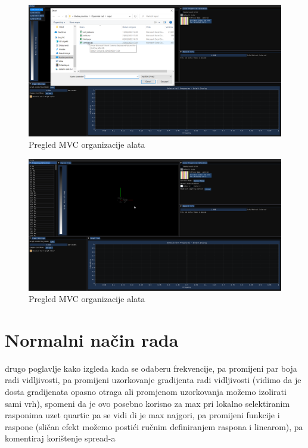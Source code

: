 \documentclass[times, utf8, diplomski]{fer}
\begin{document}
\begin{figure} [H]
	\centering
    \includegraphics[width=\textwidth]{demonstration/file_select_dialog.png}
    \caption{Pregled MVC organizacije alata}
    \label{fig:high-level-overview}
\end{figure}

\begin{figure} [H]
	\centering
    \includegraphics[width=\textwidth]{demonstration/files_loaded_screenshot.png}
    \caption{Pregled MVC organizacije alata}
    \label{fig:high-level-overview}
\end{figure}

\section{Normalni način rada}
drugo poglavlje
kako izgleda kada se odaberu frekvencije, pa promijeni par boja radi vidljivosti, pa promijeni uzorkovanje gradijenta radi vidljivosti (vidimo da je dosta gradijenata opasno otraga ali promjenom uzorkovanja možemo izolirati sami vrh), spomeni da je ovo posebno korisno za max pri lokalno selektiranim rasponima uzet quartic pa se vidi di je max najgori, pa promijeni funkcije i raspone (sličan efekt možemo postići ručnim definiranjem raspona i linearom), pa komentiraj korištenje spread-a
\end{document}
